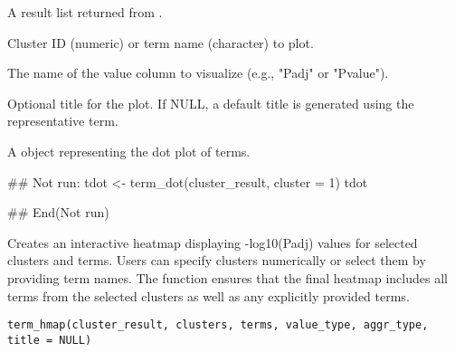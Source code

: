 \documentclass[a4paper]{book}
\begin{document}
\begin{Arguments}
\begin{ldescription}
\item[\code{cluster\_result}] A result list returned from .

\item[\code{cluster}] Cluster ID (numeric) or term name (character) to plot.

\item[\code{value\_type}] The name of the value column to visualize (e.g., "Padj" or "Pvalue").

\item[\code{title}] Optional title for the plot. If NULL, a default title is generated using the representative term.
\end{ldescription}
\end{Arguments}
%
\begin{Value}
A  object representing the dot plot of terms.
\end{Value}
%
\begin{Examples}
\begin{ExampleCode}
## Not run: 
tdot <- term_dot(cluster_result, cluster = 1)
tdot

## End(Not run)
\end{ExampleCode}
\end{Examples}
%
\begin{Description}
Creates an interactive heatmap displaying -log10(Padj) values for selected clusters
and terms. Users can specify clusters numerically or select them by providing term names.
The function ensures that the final heatmap includes all terms from the selected clusters
as well as any explicitly provided terms.
\end{Description}
%
\begin{Usage}
\begin{verbatim}
term_hmap(cluster_result, clusters, terms, value_type, aggr_type, title = NULL)
\end{verbatim}
\end{Usage}
%
\end{document}

